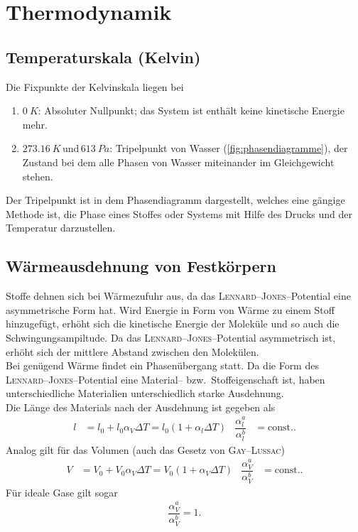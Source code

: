 
\newpage
\section{Thermodynamik}
\subsection{Temperaturskala (Kelvin)}
Die Fixpunkte der Kelvinskala liegen bei
\begin{enumerate}[label=--]
        \item $\SI{0}{K}$: Absoluter Nullpunkt; das System ist enthält keine kinetische Energie mehr.
        \item $\SI{273,16}{K}\,\text{und}\,\SI{613}{Pa}$: Tripelpunkt von Wasser (\ref{fig:phasendiagramme}), der Zustand bei dem alle Phasen von Wasser miteinander im Gleichgewicht stehen.
\end{enumerate}
Der Tripelpunkt ist in dem Phasendiagramm dargestellt, welches eine gängige Methode ist, die Phase eines Stoffes oder Systems mit Hilfe des Drucks und der Temperatur darzustellen.

\subsection{Wärmeausdehnung von Festkörpern}
Stoffe dehnen sich bei Wärmezufuhr aus, da das \textsc{Lennard}--\textsc{Jones}--Potential eine asymmetrische Form hat. 
Wird Energie in Form von Wärme zu einem Stoff hinzugefügt, erhöht sich die kinetische Energie der Moleküle und so auch die Schwingungsampiltude.
Da das \textsc{Lennard}--\textsc{Jones}--Potential asymmetrisch ist, erhöht sich der mittlere Abstand zwischen den Molekülen.\\\indent
Bei genügend Wärme findet ein Phasenübergang statt.
Da die Form des \textsc{Lennard}--\textsc{Jones}--Potential eine Material-- bzw.\ Stoffeigenschaft ist, haben unterschiedliche Materialien unterschiedlich starke Ausdehnung.\\\indent
Die Länge des Materials nach der Ausdehnung ist gegeben als 
\begin{align} 
        l&=l_0+l_0\alpha _V\Delta T=l_0\left(1+\alpha _l\Delta T\right)&\dfrac{\alpha _l^a}{\alpha _l^b}&=\text{const.}
.\end{align} 
Analog gilt für das Volumen (auch das Gesetz von \textsc{Gay--Lussac})
\begin{align} 
        V&=V_0+V_0\alpha _V\Delta T=V_0\left(1+\alpha _V\Delta T\right)&\dfrac{\alpha _V^a}{\alpha _V^b}&=\text{const.}
.\end{align} 
Für ideale Gase gilt sogar
\begin{align} 
        \dfrac{\alpha _V^a}{\alpha _V^b}=1
.\end{align} 

